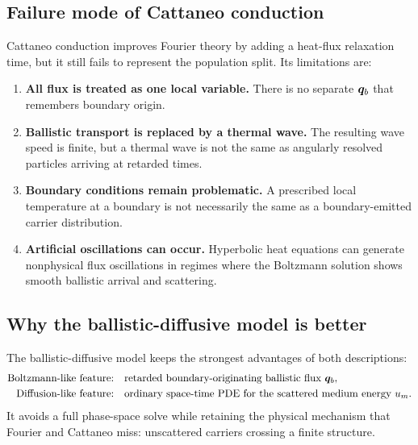 \documentclass[11pt]{article}
\begin{document}
\subsection{Failure mode of Cattaneo conduction}
Cattaneo conduction improves Fourier theory by adding a heat-flux relaxation time, but it still fails to represent the population split. Its limitations are:
\begin{enumerate}[leftmargin=1.6em]
    \item \textbf{All flux is treated as one local variable.} There is no separate \(\bm{q}_b\) that remembers boundary origin.
    \item \textbf{Ballistic transport is replaced by a thermal wave.} The resulting wave speed is finite, but a thermal wave is not the same as angularly resolved particles arriving at retarded times.
    \item \textbf{Boundary conditions remain problematic.} A prescribed local temperature at a boundary is not necessarily the same as a boundary-emitted carrier distribution.
    \item \textbf{Artificial oscillations can occur.} Hyperbolic heat equations can generate nonphysical flux oscillations in regimes where the Boltzmann solution shows smooth ballistic arrival and scattering.
\end{enumerate}

\subsection{Why the ballistic-diffusive model is better}
The ballistic-diffusive model keeps the strongest advantages of both descriptions:
\begin{align}
    \text{Boltzmann-like feature:} &\quad \text{retarded boundary-originating ballistic flux } \bm{q}_b,\\
    \text{Diffusion-like feature:} &\quad \text{ordinary space-time PDE for the scattered medium energy } u_m.
\end{align}
It avoids a full phase-space solve while retaining the physical mechanism that Fourier and Cattaneo miss: unscattered carriers crossing a finite structure.
\end{document}
